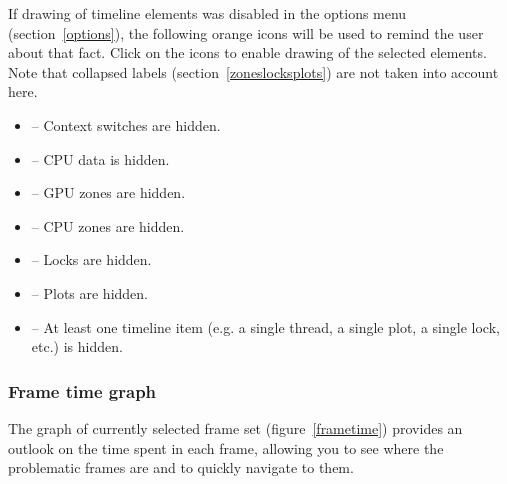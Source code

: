 \documentclass[hidelinks,titlepage,a4paper]{article}
\begin{document}
If drawing of timeline elements was disabled in the options menu (section~\ref{options}), the following orange icons will be used to remind the user about that fact. Click on the icons to enable drawing of the selected elements. Note that collapsed labels (section~\ref{zoneslocksplots}) are not taken into account here.

\begin{itemize}
\item \faHiking{} -- Context switches are hidden.
\item \faSlidersH{} -- CPU data is hidden.
\item \faEye{} -- GPU zones are hidden.
\item \faMicrochip{} -- CPU zones are hidden.
\item \faLock{} -- Locks are hidden.
\item \faSignature{} -- Plots are hidden.
\item \faLowVision{} -- At least one timeline item (e.g. a single thread, a single plot, a single lock, etc.) is hidden.
\end{itemize}

\subsubsection{Frame time graph}
\label{frametimegraph}

The graph of currently selected frame set (figure~\ref{frametime}) provides an outlook on the time spent in each frame, allowing you to see where the problematic frames are and to quickly navigate to them.
\end{document}
